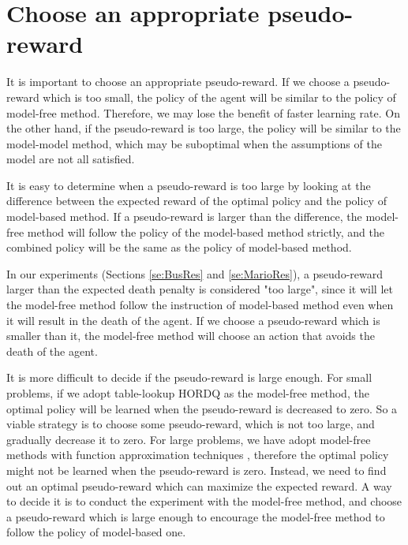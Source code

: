 


\section{Choose an appropriate pseudo-reward}
It is important to choose an appropriate pseudo-reward. If we choose a pseudo-reward which is too small, 
the policy of the agent will be similar to the policy of model-free method. Therefore, we may lose the 
benefit of faster learning rate. On the other hand, if the pseudo-reward is too large, 
the policy will be similar to the model-model method, which may be suboptimal
when the assumptions of the model are not all satisfied.

It is easy to determine when a pseudo-reward is too large by
looking at the difference between the expected reward of the optimal policy and the policy of model-based method.
If a pseudo-reward is larger than the difference, the model-free method will follow the policy
of the model-based method strictly, and the combined policy will be the same as 
the policy of model-based method.

In our experiments (Sections \ref{se:BusRes} and \ref{se:MarioRes}), a pseudo-reward larger than the expected death penalty is considered "too large", 
since it will let the model-free method follow the instruction of model-based method even 
when it will result in the death of the agent. If we choose a pseudo-reward which is smaller than it,
the model-free method will choose an action that avoids the death of the agent.

It is more difficult to decide if the pseudo-reward is large enough. 
For small problems, if we adopt table-lookup HORDQ as the model-free method,
the optimal policy will be learned when the pseudo-reward is decreased to zero.
So a viable strategy is to choose some pseudo-reward, which is not too large, and
gradually decrease it to zero.
For large problems, we have adopt model-free methods with function approximation techniques
, therefore the optimal policy might not be learned when the pseudo-reward is zero.
Instead, we need to find out an optimal pseudo-reward which can maximize the expected reward.
A way to decide it is to conduct the experiment with the model-free method,
and choose a pseudo-reward which is large enough to encourage
the model-free method to follow the policy of model-based one.


